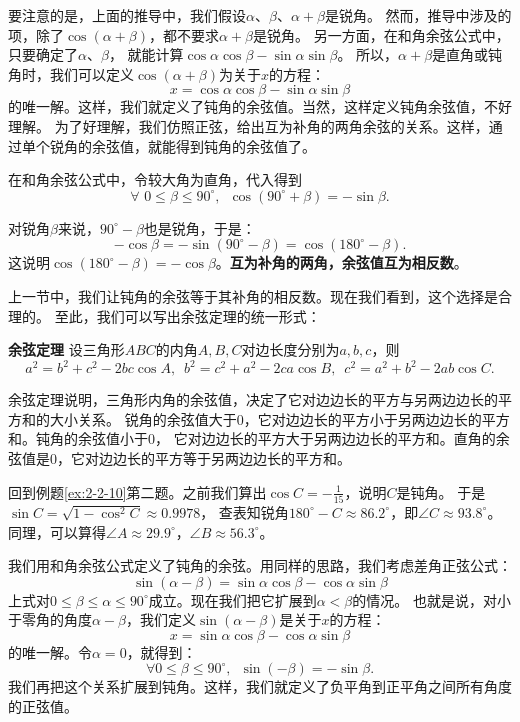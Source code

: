 \documentclass[12pt,UTF8,fontset=none]{ctexbook}
\begin{document}
要注意的是，上面的推导中，我们假设$\alpha$、$\beta$、$\alpha + \beta$是锐角。
然而，推导中涉及的项，除了$\cos(\alpha + \beta)$，都不要求$\alpha + \beta$是锐角。
另一方面，在和角余弦公式中，只要确定了$\alpha$、$\beta$，
就能计算$\cos \alpha \cos \beta - \sin\alpha \sin \beta$。
所以，$\alpha + \beta$是直角或钝角时，我们可以定义$\cos(\alpha + \beta)$为关于$x$的方程：
$$  x = \cos \alpha \cos \beta - \sin\alpha \sin \beta $$
的唯一解。这样，我们就定义了钝角的余弦值。当然，这样定义钝角余弦值，不好理解。
为了好理解，我们仿照正弦，给出互为补角的两角余弦的关系。这样，通过单个锐角的余弦值，就能得到钝角的余弦值了。

在和角余弦公式中，令较大角为直角，代入得到
$$  \forall \,\, 0 \leqslant \beta \leqslant 90^\circ , \,\,\, \cos(90^\circ + \beta) = - \sin\beta. $$

对锐角$\beta$来说，$90^\circ - \beta$也是锐角，于是：
$$ -\cos \beta = - \sin(90^\circ - \beta) = \cos(180^\circ - \beta). $$
这说明$ \cos(180^\circ - \beta) =  -\cos \beta$。\textbf{互为补角的两角，余弦值互为相反数}。

上一节中，我们让钝角的余弦等于其补角的相反数。现在我们看到，这个选择是合理的。
至此，我们可以写出余弦定理的统一形式：

\begin{tm}{\textbf{余弦定理}}\label{tm:2-4-10}
    设三角形$ABC$的内角$A,B,C$对边长度分别为$a,b,c$，则
    $$ a^2 = b^2 + c^2 - 2bc\cos A, \,\,\, b^2 = c^2 + a^2 - 2ca\cos B, \,\,\, c^2 = a^2 + b^2 - 2ab\cos C. $$
\end{tm}
余弦定理说明，三角形内角的余弦值，决定了它对边边长的平方与另两边边长的平方和的大小关系。
锐角的余弦值大于$0$，它对边边长的平方小于另两边边长的平方和。钝角的余弦值小于$0$，
它对边边长的平方大于另两边边长的平方和。直角的余弦值是$0$，它对边边长的平方等于另两边边长的平方和。

回到例题\ref{ex:2-2-10}第二题。之前我们算出$\cos C = -\frac{1}{15}$，说明$C$是钝角。
于是$\sin C = \sqrt{1 - \cos^2 C} \approx 0.9978$，
查表知锐角$180^\circ - C \approx 86.2^\circ$，即$\angle C \approx 93.8^\circ$。
同理，可以算得$\angle A \approx 29.9^\circ$，$\angle B \approx 56.3^\circ$。

我们用和角余弦公式定义了钝角的余弦。用同样的思路，我们考虑差角正弦公式：
$$ \sin(\alpha - \beta) = \sin\alpha \cos \beta - \cos \alpha \sin\beta $$
上式对$0 \leqslant \beta \leqslant \alpha \leqslant 90^\circ$成立。现在我们把它扩展到$\alpha < \beta$的情况。
也就是说，对小于零角的角度$\alpha - \beta$，我们定义$\sin (\alpha - \beta)$是关于$x$的方程：
$$ x = \sin\alpha \cos \beta - \cos \alpha \sin\beta $$
的唯一解。令$\alpha = 0$，就得到：
$$ \forall 0 \leqslant \beta \leqslant 90^\circ , \,\,\, \sin(- \beta) = -\sin\beta. $$
我们再把这个关系扩展到钝角。这样，我们就定义了负平角到正平角之间所有角度的正弦值。
\end{document}
